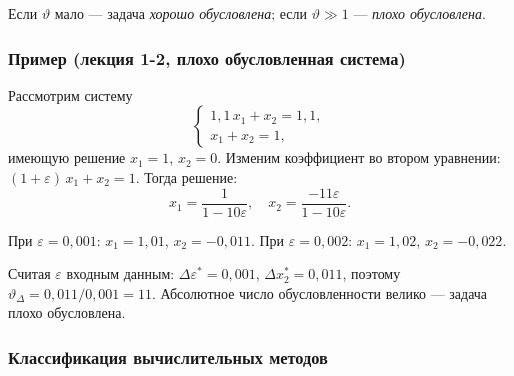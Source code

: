 Если $\vartheta$ мало --- задача \textit{хорошо обусловлена}; если $\vartheta \gg 1$ --- \textit{плохо обусловлена}.

\subsubsection*{Пример (лекция 1-2, плохо обусловленная система)}

Рассмотрим систему
\[
    \begin{cases}
        1{,}1\, x_1 + x_2 = 1{,}1, \\
        x_1 + x_2 = 1,
    \end{cases}
\]
имеющую решение $x_1 = 1$, $x_2 = 0$. Изменим коэффициент во втором уравнении: $(1+\varepsilon)\,x_1 + x_2 = 1$. Тогда решение:
\[
    x_1 = \frac{1}{1 - 10\varepsilon}, \quad x_2 = \frac{-11\varepsilon}{1 - 10\varepsilon}.
\]

При $\varepsilon = 0{,}001$: $x_1 = 1{,}01$, $x_2 = -0{,}011$. При $\varepsilon = 0{,}002$: $x_1 = 1{,}02$, $x_2 = -0{,}022$.

Считая $\varepsilon$ входным данным: $\Delta\varepsilon^* = 0{,}001$, $\Delta x_2^* = 0{,}011$, поэтому $\vartheta_\Delta = 0{,}011/0{,}001 = 11$. Абсолютное число обусловленности велико --- задача плохо обусловлена.

\subsubsection*{Классификация вычислительных методов}

